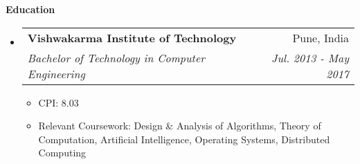\documentclass[letterpaper,12pt]{article}
\makeatletter
\newcommand{\resitem}[1]{\item #1 \vspace{-2pt}}
\newcommand{\resheading}[1]{{\large \colorbox{mygrey}{\begin{minipage}{\textwidth}{\textbf{#1 \vphantom{p\^{E}}}}\end{minipage}}}}
\newcommand{\ressubheading}[4]{
  \begin{tabular*}{7.0in}{l@{\extracolsep{\fill}}r}
    \textbf{#1} & #2 \\
    \textit{#3} & \textit{#4} \\
  \end{tabular*}\vspace{-6pt}}
\newif\ifhighschool
\makeatother
\begin{document}
\resheading{Education}
\begin{itemize}
\item
  \ressubheading{Vishwakarma Institute of Technology}{Pune, India}{Bachelor of Technology in Computer Engineering}{Jul. 2013 - May 2017}
  \begin{itemize}
    \resitem{CPI: 8.03}
    \resitem{Relevant Coursework: Design \& Analysis of Algorithms, Theory of Computation, Artificial Intelligence, Operating Systems, Distributed Computing}
  \end{itemize}
  \ifhighschool	
\item
  \ressubheading{Delhi Public School}{Pune, India}{12th Grade CBSE}{May 2013}
  \begin{itemize}
    \resitem{Percentage: 76.4\%}
  \end{itemize}
\item
  \ressubheading{Delhi Public School}{Pune, India}{10th Grade CBSE}{May 2011}
  \begin{itemize}
    \resitem{CGPA: 8.6}
  \end{itemize}
  \fi
\end{itemize}

\pagebreak
\end{document}
